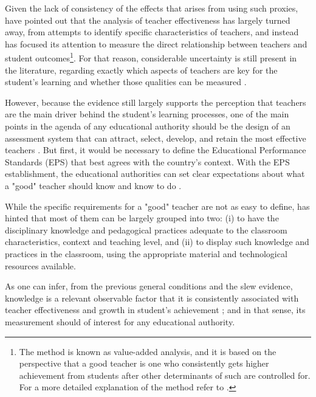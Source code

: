 Given the lack of consistency of the effects that arises from using such proxies, \citet{Hanushek_et_al_2012} have pointed out that the analysis of teacher effectiveness has largely turned away, from attempts to identify specific characteristics of teachers, and instead has focused its attention to measure the direct relationship between teachers and student outcomes\footnote{The method is known as value-added analysis, and it is based on the perspective that a good teacher is one who consistently gets higher achievement from students after other determinants of such are controlled for. For a more detailed explanation of the method refer to \citet{Scherrer_2011}.}. For that reason, considerable uncertainty is still present in the literature, regarding exactly which aspects of teachers are key for the student's learning and whether those qualities can be measured \citep{Rockoff_2004, Clotfelter_et_al_2006}.

However, because the evidence still largely supports the perception that teachers are the main driver behind the student's learning processes, one of the main points in the agenda of any educational authority should be the design of an assessment system that can attract, select, develop, and retain the most effective teachers \citep{Elacqua_et_al_2018}. But first, it would be necessary to define the Educational Performance Standards (EPS) that best agrees with the country's context. With the EPS establishment, the educational authorities can set clear expectations about what a "good" teacher should know and know to do \citep{Hincapie_et_al_2020}.

While the specific requirements for a "good" teacher are not as easy to define, \citet{Hincapie_et_al_2020} has hinted that most of them can be largely grouped into two: (i) to have the disciplinary knowledge and pedagogical practices adequate to the classroom characteristics, context and teaching level, and (ii) to display such knowledge and practices in the classroom, using the appropriate material and technological resources available. 

As one can infer, from the previous general conditions and the slew evidence, knowledge is a relevant observable factor that it is consistently associated with teacher effectiveness and growth in student's achievement \citep{Santibanez_2006, Clotfelter_et_al_2006, Clotfelter_et_al_2007, Hanushek_et_al_2006, Marshall_2009, Rockoff_et_al_2011, Kane_et_al_2011, Kane_et_al_2012, Ome_2012, Metzler_et_al_2012, Kane_et_al_2013, Araujo_et_al_2016, Bietenbeck_et_al_2018, Estrada_2019}; and in that sense, its measurement should of interest for any educational authority.

